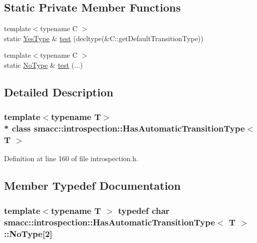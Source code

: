 \subsection*{Static Private Member Functions}
\begin{DoxyCompactItemize}
\item 
{\footnotesize template$<$typename C $>$ }\\static \hyperlink{classsmacc_1_1introspection_1_1HasAutomaticTransitionType_abeb599df547eb3db36684b6cb343eade}{Yes\+Type} \& \hyperlink{classsmacc_1_1introspection_1_1HasAutomaticTransitionType_a3521b68e2adb57520d3ca8cfbea082fb}{test} (decltype(\&C\+::get\+Default\+Transition\+Type))
\item 
{\footnotesize template$<$typename C $>$ }\\static \hyperlink{classsmacc_1_1introspection_1_1HasAutomaticTransitionType_aa2e976214fc770f53aaae67fc049caab}{No\+Type} \& \hyperlink{classsmacc_1_1introspection_1_1HasAutomaticTransitionType_a660ac4a6eac5d86d133f2cfb905d22f3}{test} (...)
\end{DoxyCompactItemize}


\subsection{Detailed Description}
\subsubsection*{template$<$typename T$>$\\*
class smacc\+::introspection\+::\+Has\+Automatic\+Transition\+Type$<$ T $>$}



Definition at line 160 of file introspection.\+h.



\subsection{Member Typedef Documentation}
\subsubsection[{\texorpdfstring{No\+Type}{NoType}}]{\setlength{\rightskip}{0pt plus 5cm}template$<$typename T $>$ typedef char {\bf smacc\+::introspection\+::\+Has\+Automatic\+Transition\+Type}$<$ T $>$\+::No\+Type\mbox{[}2\mbox{]}\hspace{0.3cm}{\ttfamily [private]}}\hypertarget{classsmacc_1_1introspection_1_1HasAutomaticTransitionType_aa2e976214fc770f53aaae67fc049caab}{}\label{classsmacc_1_1introspection_1_1HasAutomaticTransitionType_aa2e976214fc770f53aaae67fc049caab}


